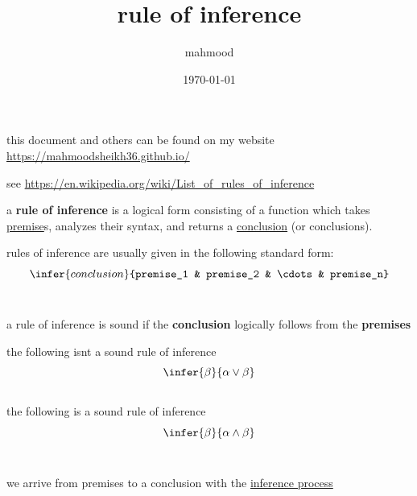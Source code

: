 \documentclass[a4paper,12pt]{article}
\author{mahmood}
\date{\today}
\title{rule of inference}
\begin{document}
\maketitle
\begin{note}
this document and others can be found on my website\\
\url{https://mahmoodsheikh36.github.io/}
\end{note}
see \url{https://en.wikipedia.org/wiki/List\_of\_rules\_of\_inference}\\
\begin{definition}
a \textbf{rule of inference} is a logical form consisting of a function which takes \href{20230524212241-premise.org}{premise}s, analyzes their syntax, and returns a \href{20230524212250-conclusion.org}{conclusion} (or conclusions).\\
\end{definition}
rules of inference are usually given in the following standard form:\\
\[
\infer{conclusion}{premise_1 & premise_2 & \cdots & premise_n}
\]\\
\begin{characteristic}
a rule of inference is sound if the \textbf{conclusion} logically follows from the \textbf{premises}\\
\begin{my_example}
the following isnt a sound rule of inference\\
\[
\infer{\beta}{\alpha \lor \beta}
\]\\
the following is a sound rule of inference\\
\[
\infer{\beta}{\alpha \land \beta}
\]\\
\end{my_example}
\end{characteristic}
we arrive from premises to a conclusion with the \href{20230525071323-formal_proof.org}{inference process}
\end{document}
